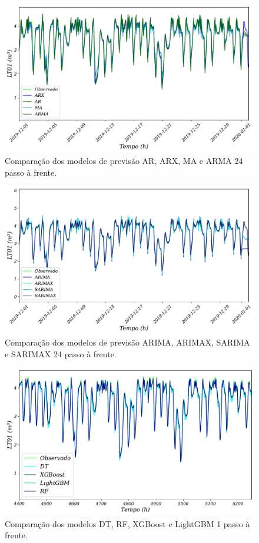 \begin{figure}[!htb]
	\centering
	\caption{Comparação dos modelos de previsão AR, ARX, MA e ARMA 24 passo à frente.}
	\label{fig:1-ar-arx-ma}
	\includegraphics[width=0.7\linewidth]{Resultados/Figuras/ARX-AR-MA-ARMA-24}
	
\end{figure}
\begin{figure}[!htb]
	\centering
	\caption{Comparação dos modelos de previsão ARIMA, ARIMAX, SARIMA e SARIMAX 24 passo à frente.}
	\label{fig:1-arimax-sarima-sarimax}
	\includegraphics[width=0.7\linewidth]{Resultados/Figuras/ARIMA-SARIMA-ARIMAX-SARIMAX-24}
	
\end{figure}

\begin{figure}[!htb]
	\centering
	\caption{Comparação dos modelos DT, RF, XGBoost e LightGBM 1 passo à frente.}
	\label{fig:lr-xgb-lgbm-rf}
	\includegraphics[width=0.7\linewidth]{Resultados/Figuras/LR-XGB-LGBM-RF}
	
\end{figure}

